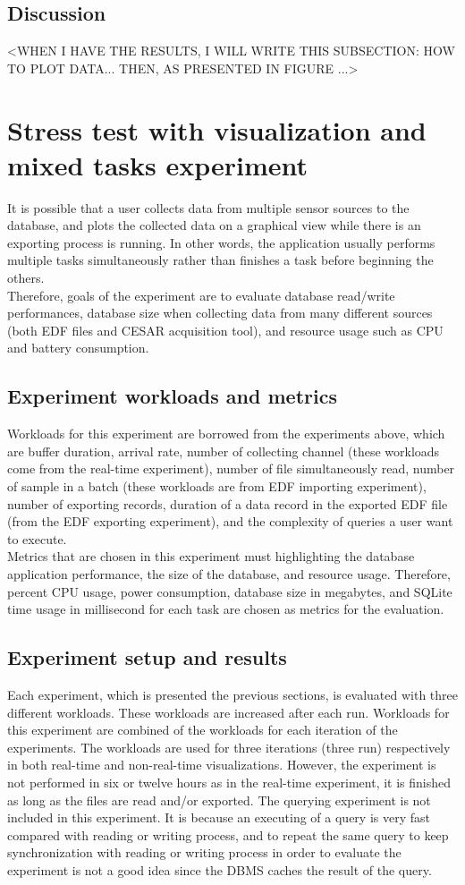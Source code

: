 \subsection{Discussion}
<WHEN I HAVE THE RESULTS, I WILL WRITE THIS SUBSECTION: HOW TO PLOT DATA... THEN, AS PRESENTED IN FIGURE ...>
\section{Stress test with visualization and mixed tasks experiment}
It is possible that a user collects data from multiple sensor sources to the database, and plots the collected data on a graphical view while there is an exporting process is running. In other words, the application usually performs multiple tasks simultaneously rather than finishes a task before beginning the others.\\
Therefore, goals of the experiment are to evaluate database read/write performances, database size when collecting data from many different sources (both EDF files and CESAR acquisition tool), and resource usage such as CPU and battery consumption.
\subsection{Experiment workloads and metrics}
Workloads for this experiment are borrowed from the experiments above, which are buffer duration, arrival rate, number of collecting channel (these workloads come from the real-time experiment), number of file simultaneously read, number of sample in a batch (these workloads are from EDF importing experiment), number of exporting records, duration of a data record in the exported EDF file (from the EDF exporting experiment), and the complexity of queries a user want to execute.\\
Metrics that are chosen in this experiment must highlighting the database application performance, the size of the database, and resource usage. Therefore, percent CPU usage, power consumption, database size in megabytes, and SQLite time usage in millisecond for each task are chosen as metrics for the evaluation.
\subsection{Experiment setup and results}
Each experiment, which is presented the previous sections, is evaluated with three different workloads. These workloads are increased after each run. Workloads for this experiment are combined of the workloads for each iteration of the experiments. The workloads are used for three iterations (three run) respectively in both real-time and non-real-time visualizations. However, the experiment is not performed in six or twelve hours as in the real-time experiment, it is finished as long as the files are read and/or exported. The querying experiment is not included in this experiment. It is because an executing of a query is very fast compared with reading or writing process, and to repeat the same query to keep synchronization with reading or writing process in order to evaluate the experiment is not a good idea since the DBMS caches the result of the query.
